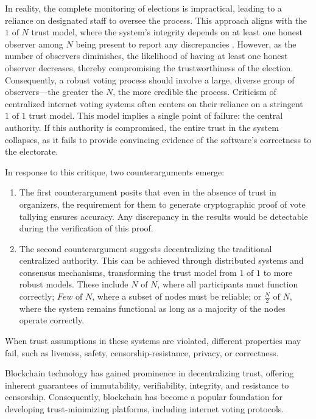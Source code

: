 \documentclass[runningheads]{llncs}
\begin{document}
In reality, the complete monitoring of elections is impractical, leading to a reliance on designated staff to oversee the process. This approach aligns with the $1 \textrm{ of } N$ trust model, where the system's integrity depends on at least one honest observer among $N$ being present to report any discrepancies \cite{buterinTrustModels2020}. However, as the number of observers diminishes, the likelihood of having at least one honest observer decreases, thereby compromising the trustworthiness of the election. Consequently, a robust voting process should involve a large, diverse group of observers—the greater the $N$, the more credible the process.
Criticism of centralized internet voting systems often centers on their reliance on a stringent $1\textrm{ of }1$ trust model. This model implies a single point of failure: the central authority. If this authority is compromised, the entire trust in the system collapses, as it fails to provide convincing evidence of the software's correctness to the electorate.

In response to this critique, two counterarguments emerge:
\begin{enumerate}
\item The first counterargument posits that even in the absence of trust in organizers, the requirement for them to generate cryptographic proof of vote tallying ensures accuracy. Any discrepancy in the results would be detectable during the verification of this proof.
\item The second counterargument suggests decentralizing the traditional centralized authority. This can be achieved through distributed systems and consensus mechanisms, transforming the trust model from $1 \textrm{ of } 1$ to more robust models. These include $N \textrm{ of } N$, where all participants must function correctly; $Few \textrm{ of } N$, where a subset of nodes must be reliable; or $\frac{N}{2} \textrm{ of } N$, where the system remains functional as long as a majority of the nodes operate correctly.
\end{enumerate}

When trust assumptions in these systems are violated, different properties may fail, such as liveness, safety, censorship-resistance, privacy, or correctness.

Blockchain technology has gained prominence in decentralizing trust, offering inherent guarantees of immutability, verifiability, integrity, and resistance to censorship. Consequently, blockchain has become a popular foundation for developing trust-minimizing platforms, including internet voting protocols.
\end{document}
